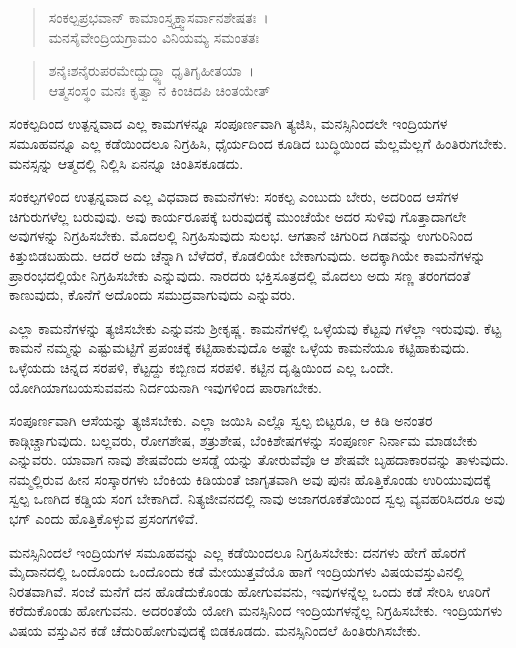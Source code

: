 \begin{verse}
ಸಂಕಲ್ಪಪ್ರಭವಾನ್ ಕಾಮಾಂಸ್ತ್ಯಕ್ತ್ವಾಸರ್ವಾನಶೇಷತಃ~।\\ಮನಸೈವೇಂದ್ರಿಯಗ್ರಾಮಂ ವಿನಿಯಮ್ಯ ಸಮಂತತಃ 
\end{verse}

\begin{verse}
ಶನೈಃಶನೈರುಪರಮೇದ್ಬುದ್ಧ್ಯಾ ಧೃತಿಗೃಹೀತಯಾ~।\\ಆತ್ಮಸಂಸ್ಥಂ ಮನಃ ಕೃತ್ವಾ ನ ಕಿಂಚಿದಪಿ ಚಿಂತಯೇತ್ 
\end{verse}

{\small ಸಂಕಲ್ಪದಿಂದ ಉತ್ಪನ್ನವಾದ ಎಲ್ಲ ಕಾಮಗಳನ್ನೂ ಸಂಪೂರ್ಣವಾಗಿ ತ್ಯಜಿಸಿ, ಮನಸ್ಸಿನಿಂದಲೇ ಇಂದ್ರಿಯಗಳ ಸಮೂಹವನ್ನೂ ಎಲ್ಲ ಕಡೆಯಿಂದಲೂ ನಿಗ್ರಹಿಸಿ, ಧೈರ್ಯದಿಂದ ಕೂಡಿದ ಬುದ್ಧಿಯಿಂದ ಮೆಲ್ಲಮೆಲ್ಲಗೆ ಹಿಂತಿರುಗಬೇಕು. ಮನಸ್ಸನ್ನು ಆತ್ಮದಲ್ಲಿ ನಿಲ್ಲಿಸಿ ಏನನ್ನೂ ಚಿಂತಿಸಕೂಡದು.}

ಸಂಕಲ್ಪಗಳಿಂದ ಉತ್ಪನ್ನವಾದ ಎಲ್ಲ ವಿಧವಾದ ಕಾಮನೆಗಳು: ಸಂಕಲ್ಪ ಎಂಬುದು ಬೇರು, ಅದರಿಂದ ಆಸೆಗಳ ಚಿಗುರುಗಳೆಲ್ಲ ಬರುವುವು. ಅವು ಕಾರ್ಯರೂಪಕ್ಕೆ ಬರುವುದಕ್ಕೆ ಮುಂಚೆಯೇ ಅದರ ಸುಳಿವು ಗೊತ್ತಾದಾಗಲೇ ಅವುಗಳನ್ನು ನಿಗ್ರಹಿಸಬೇಕು. ಮೊದಲಲ್ಲಿ ನಿಗ್ರಹಿಸುವುದು ಸುಲಭ. ಆಗತಾನೆ ಚಿಗುರಿದ ಗಿಡವನ್ನು ಉಗುರಿನಿಂದ ಕಿತ್ತುಬಿಡಬಹುದು. ಆದರೆ ಅದು ಚೆನ್ನಾಗಿ ಬೆಳೆದರೆ, ಕೊಡಲಿಯೇ ಬೇಕಾಗುವುದು. ಅದಕ್ಕಾಗಿಯೇ ಕಾಮನೆಗಳನ್ನು ಪ್ರಾರಂಭದಲ್ಲಿಯೇ ನಿಗ್ರಹಿಸಬೇಕು ಎನ್ನುವುದು. ನಾರದರು ಭಕ್ತಿಸೂತ್ರದಲ್ಲಿ ಮೊದಲು ಅದು ಸಣ್ಣ ತರಂಗದಂತೆ ಕಾಣುವುದು, ಕೊನೆಗೆ ಅದೊಂದು ಸಮುದ್ರವಾಗುವುದು ಎನ್ನುವರು.

ಎಲ್ಲಾ ಕಾಮನೆಗಳನ್ನು ತ್ಯಜಿಸಬೇಕು ಎನ್ನುವನು ಶ‍್ರೀಕೃಷ್ಣ. ಕಾಮನೆಗಳಲ್ಲಿ ಒಳ್ಳೆಯವು ಕೆಟ್ಟವು ಗಳೆಲ್ಲಾ ಇರುವುವು. ಕೆಟ್ಟ ಕಾಮನೆ ನಮ್ಮನ್ನು ಎಷ್ಟುಮಟ್ಟಿಗೆ ಪ್ರಪಂಚಕ್ಕೆ ಕಟ್ಟಿಹಾಕುವುದೊ ಅಷ್ಟೇ ಒಳ್ಳೆಯ ಕಾಮನೆಯೂ ಕಟ್ಟಿಹಾಕುವುದು. ಒಳ್ಳೆಯದು ಚಿನ್ನದ ಸರಪಳಿ, ಕೆಟ್ಟದ್ದು ಕಬ್ಬಿಣದ ಸರಪಳಿ. ಕಟ್ಟಿನ ದೃಷ್ಟಿಯಿಂದ ಎಲ್ಲ ಒಂದೇ. ಯೋಗಿಯಾಗಬಯಸುವವನು ನಿರ್ದಯನಾಗಿ ಇವುಗಳಿಂದ ಪಾರಾಗಬೇಕು.

ಸಂಪೂರ್ಣವಾಗಿ ಆಸೆಯನ್ನು ತ್ಯಜಿಸಬೇಕು. ಎಲ್ಲಾ ಜಯಿಸಿ ಎಲ್ಲೊ ಸ್ವಲ್ಪ ಬಿಟ್ಟರೂ, ಆ ಕಿಡಿ ಅನಂತರ ಕಾಡ್ಗಿಚ್ಚಾಗುವುದು. ಬಲ್ಲವರು, ರೋಗಶೇಷ, ಶತ್ರುಶೇಷ, ಬೆಂಕಿಶೇಷಗಳನ್ನು ಸಂಪೂರ್ಣ ನಿರ್ನಾಮ ಮಾಡಬೇಕು ಎನ್ನುವರು. ಯಾವಾಗ ನಾವು ಶೇಷವೆಂದು ಅಸಡ್ಡೆ ಯನ್ನು ತೋರುವೆವೊ ಆ ಶೇಷವೇ ಬೃಹದಾಕಾರವನ್ನು ತಾಳುವುದು. ನಮ್ಮಲ್ಲಿರುವ ಹೀನ ಸಂಸ್ಕಾರಗಳು ಬೆಂಕಿಯ ಕಿಡಿಯಂತೆ ಜಾಗೃತವಾಗಿ ಅವು ಪುನಃ ಹೊತ್ತಿಕೊಂಡು ಉರಿಯುವುದಕ್ಕೆ ಸ್ವಲ್ಪ ಒಣಗಿದ ಕಡ್ಡಿಯ ಸಂಗ ಬೇಕಾಗಿದೆ. ನಿತ್ಯಜೀವನದಲ್ಲಿ ನಾವು ಅಜಾಗರೂಕತೆಯಿಂದ ಸ್ವಲ್ಪ ವ್ಯವಹರಿಸಿದರೂ ಅವು ಭಗ್ ಎಂದು ಹೊತ್ತಿಕೊಳ್ಳುವ ಪ್ರಸಂಗಗಳಿವೆ.

ಮನಸ್ಸಿನಿಂದಲೆ ಇಂದ್ರಿಯಗಳ ಸಮೂಹವನ್ನು ಎಲ್ಲ ಕಡೆಯಿಂದಲೂ ನಿಗ್ರಹಿಸಬೇಕು: ದನಗಳು ಹೇಗೆ ಹೊರಗೆ ಮೈದಾನದಲ್ಲಿ ಒಂದೊಂದು ಒಂದೊಂದು ಕಡೆ ಮೇಯುತ್ತವೆಯೊ ಹಾಗೆ ಇಂದ್ರಿಯಗಳು ವಿಷಯವಸ್ತುವಿನಲ್ಲಿ ನಿರತವಾಗಿವೆ. ಸಂಜೆ ಮನೆಗೆ ದನ ಹೊಡೆದುಕೊಂಡು ಹೋಗುವವನು, ಇವುಗಳನ್ನೆಲ್ಲ ಒಂದು ಕಡೆ ಸೇರಿಸಿ ಊರಿಗೆ ಕರೆದುಕೊಂಡು ಹೋಗುವನು. ಅದರಂತೆಯೆ ಯೋಗಿ ಮನಸ್ಸಿನಿಂದ ಇಂದ್ರಿಯಗಳನ್ನೆಲ್ಲ ನಿಗ್ರಹಿಸಬೇಕು. ಇಂದ್ರಿಯಗಳು ವಿಷಯ ವಸ್ತುವಿನ ಕಡೆ ಚೆದುರಿಹೋಗುವುದಕ್ಕೆ ಬಿಡಕೂಡದು. ಮನಸ್ಸಿನಿಂದಲೆ ಹಿಂತಿರುಗಿಸಬೇಕು.

